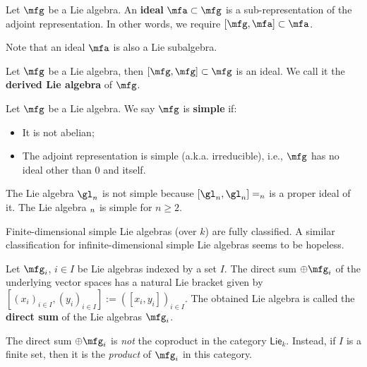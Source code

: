 \begin{defn}
	Let $\mfg$ be a Lie algebra. An \textbf{ideal} $\mfa \subset \mfg$ is a sub-representation of the adjoint representation. In other words, we require $[\mfg,\mfa] \subset \mfa$.
\end{defn}

\begin{rem}
	Note that an ideal $\mfa$ is also a Lie subalgebra.
\end{rem}

\begin{exam}
	Let $\mfg$ be a Lie algebra, then $[\mfg,\mfg]\subset \mfg$ is an ideal. We call it the \textbf{derived Lie algebra} of $\mfg$.
\end{exam}

\begin{defn}
	Let $\mfg$ be a Lie algebra. We say $\mfg$ is \textbf{simple} if:
	\begin{itemize}
		\item It is not abelian;
		\item The adjoint representation is simple (a.k.a. irreducible), i.e., $\mfg$ has no ideal other than $0$ and itself.
	\end{itemize}
\end{defn}

\begin{exam}
	The Lie algebra $\gl_n$ is not simple because $[\gl_n,\gl_n] = \sl_n$ is a proper ideal of it. The Lie algebra $\sl_n$ is simple for $n\ge 2$.
\end{exam}

\begin{rem}
	Finite-dimensional simple Lie algebras (over $k$) are fully classified. A similar classification for infinite-dimensional simple Lie algebras seems to be hopeless.
\end{rem}

\begin{defn}
	Let $\mfg_i$, $i\in I$ be Lie algebras indexed by a set $I$. The direct sum $\oplus \mfg_i$ of the underlying vector spaces has a natural Lie bracket given by $[(x_i)_{i\in I},(y_i)_{i\in I}]:=([x_i,y_i])_{i\in I}$. The obtained Lie algebra is called the \textbf{direct sum} of the Lie algebras $\mfg_i$.
\end{defn}

\begin{warn}
	The direct sum $\oplus \mfg_i$ is \emph{not} the coproduct in the category $\mathsf{Lie}_k$. Instead, if $I$ is a finite set, then it is the \emph{product} of $\mfg_i$ in this category.
\end{warn}

